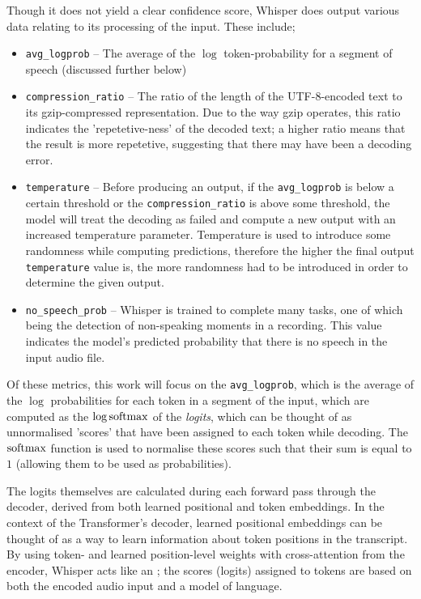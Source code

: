 Though it does not yield a clear confidence score, Whisper does output various data relating to its processing of the input.
These include;

\begin{itemize}
  \item \texttt{avg\_logprob} -- The average of the $\log$ token-probability for a segment of speech (discussed further below)
  \item \texttt{compression\_ratio} -- The ratio of the length of the UTF-8-encoded text to its gzip-compressed representation.
    Due to the way gzip operates, this ratio indicates the 'repetetive-ness' of the decoded text; a higher ratio means that the result is more repetetive, suggesting that there may have been a decoding error.
  \item \texttt{temperature} -- Before producing an output, if the \texttt{avg\_logprob} is below a certain threshold or the \texttt{compression\_ratio} is above some threshold, the model will treat the decoding as failed and compute a new output with an increased temperature parameter.
    Temperature is used to introduce some randomness while computing predictions, therefore the higher the final output \texttt{temperature} value is, the more randomness had to be introduced in order to determine the given output.
  \item \texttt{no\_speech\_prob} -- Whisper is trained to complete many tasks, one of which being the detection of non-speaking moments in a recording.
    This value indicates the model's predicted probability that there is no speech in the input audio file.
\end{itemize}

Of these metrics, this work will focus on the \texttt{avg\_logprob}, which is the average of the $\log$ probabilities for each token in a segment of the input, which are computed as the $\log \operatorname{softmax}$ of the \emph{logits}, which can be thought of as unnormalised 'scores' that have been assigned to each token while decoding.
The $\operatorname{softmax}$ function is used to normalise these scores such that their sum is equal to $1$ (allowing them to be used as probabilities).

The logits themselves are calculated during each forward pass through the decoder, derived from both learned positional and token embeddings.
In the context of the Transformer's decoder, learned positional embeddings can be thought of as a way to learn information about token positions in the transcript\cite{wang2020position}.
By using token- and learned position-level weights with cross-attention from the encoder\cite{vaswani2017attention}, Whisper acts like an \cite{whisper}; the scores (logits) assigned to tokens are based on both the encoded audio input and a model of language.

